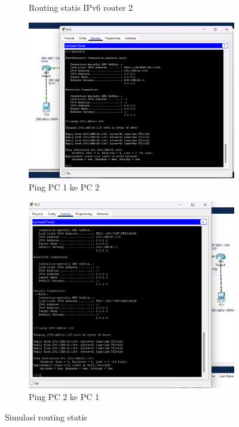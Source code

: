 \begin{figure}[H]
\begin{subfigure}[b]{0.4\linewidth}
		\caption{Routing statis IPv6 router 2\label{fig:routingR2}}
	\end{subfigure}
	\hspace{1cm}
	\begin{subfigure}[b]{0.55\linewidth}
		\centering
		\includegraphics[width=\linewidth]{P2/img/tumod (7).png}
		\caption{Ping PC 1 ke PC 2\label{fig:pingPC1}}
	\end{subfigure}
	\begin{subfigure}[b]{0.5\linewidth}
		\centering
		\includegraphics[width=\linewidth]{P2/img/tumod (8).png}
		\caption{Ping PC 2 ke PC 1\label{fig:pingPC2}}
	\end{subfigure}
	\hspace{1cm}
	\caption{Simulasi routing statis}
\end{figure}

